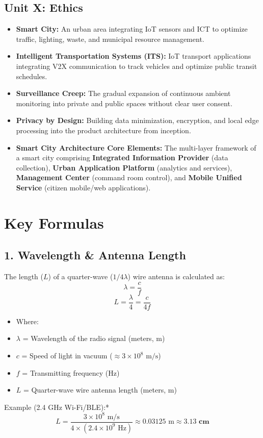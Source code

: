 \subsection{Unit X: Ethics}
\begin{itemize}
  \item   \textbf{Smart City:} An urban area integrating IoT sensors and ICT to optimize traffic, lighting, waste, and municipal resource management.
  \item   \textbf{Intelligent Transportation Systems (ITS):} IoT transport applications integrating V2X communication to track vehicles and optimize public transit schedules.
  \item   \textbf{Surveillance Creep:} The gradual expansion of continuous ambient monitoring into private and public spaces without clear user consent.
  \item   \textbf{Privacy by Design:} Building data minimization, encryption, and local edge processing into the product architecture from inception.
  \item   \textbf{Smart City Architecture Core Elements:} The multi-layer framework of a smart city comprising \textbf{Integrated Information Provider} (data collection), \textbf{Urban Application Platform} (analytics and services), \textbf{Management Center} (command room control), and \textbf{Mobile Unified Service} (citizen mobile/web applications).
\end{itemize}



\section{Key Formulas}

\subsection{1. Wavelength \& Antenna Length}
The length ($L$) of a quarter-wave ($1/4\lambda$) wire antenna is calculated as:
\[ \lambda = \frac{c}{f} \]
\[ L = \frac{\lambda}{4} = \frac{c}{4f} \]

\begin{itemize}
  \item   Where:
  \item   $\lambda$ = Wavelength of the radio signal (meters, $\text{m}$)
  \item   $c$ = Speed of light in vacuum ($\approx 3 \times 10^8\text{ m/s}$)
  \item   $f$ = Transmitting frequency ($\text{Hz}$)
  \item   $L$ = Quarter-wave wire antenna length (meters, $\text{m}$)
\end{itemize}
\textit{   }Example (2.4 GHz Wi-Fi/BLE):*
    \[ L = \frac{3 \times 10^8\text{ m/s}}{4 \times (2.4 \times 10^9\text{ Hz})} \approx 0.03125\text{ m} \approx \mathbf{3.13\text{ cm}} \]

